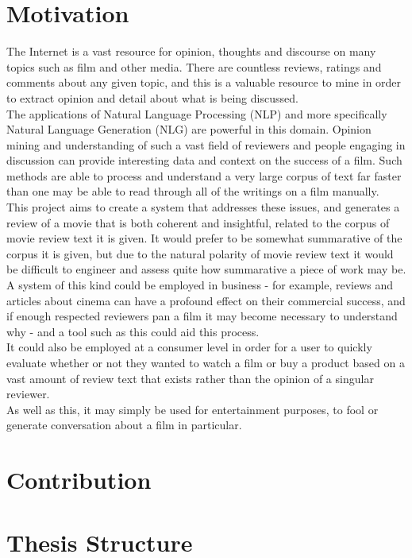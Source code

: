 \section{Motivation}

The Internet is a vast resource for opinion, thoughts and discourse on many topics such as film and other media. There are countless reviews, ratings and comments about any given topic, and this is a valuable resource to mine in order to extract opinion and detail about what is being discussed.\\

The applications of Natural Language Processing (NLP) and more specifically Natural Language Generation (NLG) are powerful in this domain.  Opinion mining and understanding of such a vast field of reviewers and people engaging in discussion can provide interesting data and context on the success of a film. Such methods are able to process and understand a very large corpus of text far faster than one may be able to read through all of the writings on a film manually. \\

This project aims to create a system that addresses these issues, and generates a review of a movie that is both coherent and insightful, related to the corpus of movie review text it is given. It would prefer to be somewhat summarative of the corpus it is given, but due to the natural polarity of movie review text it would be difficult to engineer and assess quite how summarative a piece of work may be.\\

A system of this kind could be employed in business - for example, reviews and articles about cinema can have a profound effect on their commercial success, and if enough respected reviewers pan a film it may become necessary to understand why - and a tool such as this could aid this process.\\

It could also be employed at a consumer level in order for a user to quickly evaluate whether or not they wanted to watch a film or buy a product based on a vast amount of review text that exists rather than the opinion of a singular reviewer.\\
As well as this, it may simply be used for entertainment purposes, to fool or generate conversation about a film in particular.\\



\section{Contribution}


\section{Thesis Structure}
